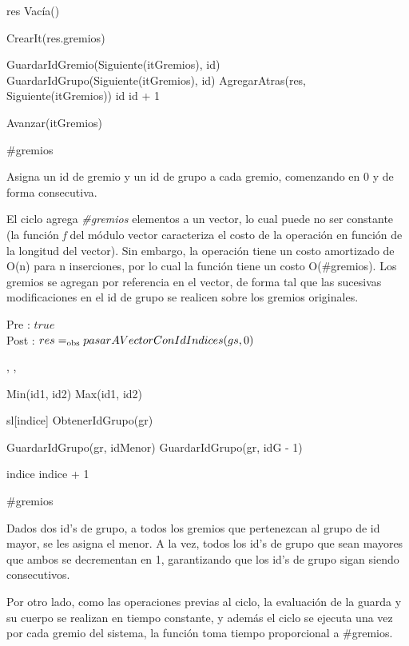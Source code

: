 {
	\state {} 											
	\state res \asig 	Vac\'ia()											
	\state 

	\state {} \asig CrearIt(res.gremios)		
		\state
		
		\state GuardarIdGremio(Siguiente(itGremios), id)					
		\state GuardarIdGrupo(Siguiente(itGremios), id)						
		\state AgregarAtras(res, Siguiente(itGremios))						
		\state id \asig id + 1												
		
		\state
		\state Avanzar(itGremios)											
	\endwhile
}
{ \#gremios }
{ Asigna un id de gremio y un id de grupo a cada gremio, comenzando en 0 y de forma consecutiva.

\hspace{10pt} El ciclo agrega \emph{\#gremios} elementos a un vector, lo cual puede no ser constante (la funci\'on \emph{f} del m\'odulo vector caracteriza el costo de la operación en función de la longitud del vector). Sin embargo, la operaci\'on tiene un costo amortizado de O(n) para n inserciones, por lo cual la funci\'on tiene un costo O(\#gremios). Los gremios se agregan por referencia en el vector, de forma tal que las sucesivas modificaciones en el id de grupo se realicen sobre los gremios originales. }

Pre : \ensuremath{true}
\\
Post : \ensuremath{ res \igobs pasarAVectorConIdIndices(gs, 0) }


{, , }{}
{
	\state {} \asig Min(id1, id2)						
	\state {} \asig Max(id1, id2)						
	\state

	\state {} 										

									
		\state

		\state {} \asig sl[indice]					
		\state {} \asig ObtenerIdGrupo(gr)					
		\state

														
			\state GuardarIdGrupo(gr, idMenor)								
		\Else {}										
				\state GuardarIdGrupo(gr, idG - 1)							
			\endif
		\endif
		\state

		\state indice \asig indice + 1										
	\endwhile
}
{\#gremios}
{ Dados dos id's de grupo, a todos los gremios que pertenezcan al grupo de id mayor, se les asigna el menor. A la vez, todos los id's de grupo que sean mayores que ambos se decrementan en 1, garantizando que los id's de grupo sigan siendo consecutivos.

\hspace{10pt} Por otro lado, como las operaciones previas al ciclo, la evaluaci\'on de la guarda y su cuerpo se realizan en tiempo constante, y adem\'as el ciclo se ejecuta una vez por cada gremio del sistema, la funci\'on toma tiempo proporcional a \#gremios. }

